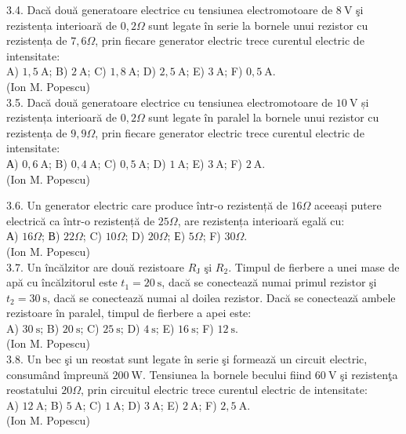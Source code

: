 \documentclass[10pt]{article}
\begin{document}
3.4. Dacă două generatoare electrice cu tensiunea electromotoare de $8 \mathrm{~V}$ şi rezistența interioară de $0,2 \Omega$ sunt legate în serie la bornele unui rezistor cu rezistența de $7,6 \Omega$, prin fiecare generator electric trece curentul electric de intensitate:\\ A) $1,5 \mathrm{~A}$; B) $2 \mathrm{~A}$; C) $1,8 \mathrm{~A}$; D) $2,5 \mathrm{~A}$; E) $3 \mathrm{~A}$; F) $0,5 \mathrm{~A}$.\\ (Ion M. Popescu)\\

3.5. Dacă două generatoare electrice cu tensiunea electromotoare de $10 \mathrm{~V}$ și rezistența interioară de $0,2 \Omega$ sunt legate în paralel la bornele unui rezistor cu rezistența de $9,9 \Omega$, prin fiecare generator electric trece curentul electric de intensitate:\\ А) $0,6 \mathrm{~A}$; B) $0,4 \mathrm{~A}$; C) $0,5 \mathrm{~A}$; D) $1 \mathrm{~A}$; E) $3 \mathrm{~A}$; F) $2 \mathrm{~A}$.\\ (Ion M. Popescu)

3.6. Un generator electric care produce într-o rezistență de $16 \Omega$ aceeași putere electrică ca într-o rezistență de $25 \Omega$, are rezistența interioară egală cu:\\ А) $16 \Omega$; В) $22 \Omega$; C) $10 \Omega$; D) $20 \Omega$; Е) $5 \Omega$; F) $30 \Omega$.\\ (Ion M. Popescu)\\

3.7. Un încălzitor are două rezistoare $R_{\mathrm{J}}$ şi $R_{2}$. Timpul de fierbere a unei mase de apă cu încălzitorul este $t_{1}=20 \mathrm{~s}$, dacă se conectează numai primul rezistor şi $t_{2}=30 \mathrm{~s}$, dacă se conectează numai al doilea rezistor. Dacă se conectează ambele rezistoare în paralel, timpul de fierbere a apei este:\\ A) $30 \mathrm{~s}$; B) $20 \mathrm{~s}$; C) $25 \mathrm{~s}$; D) $4 \mathrm{~s}$; E) $16 \mathrm{~s}$; F) $12 \mathrm{~s}$.\\ (Ion M. Popescu)\\

3.8. Un bec şi un reostat sunt legate în serie şi formează un circuit electric, consumând împreună $200 \mathrm{~W}$. Tensiunea la bornele becului fiind $60 \mathrm{~V}$ şi rezistenţa reostatului $20 \Omega$, prin circuitul electric trece curentul electric de intensitate:\\ A) $12 \mathrm{~A}$; B) $5 \mathrm{~A}$; C) $1 \mathrm{~A}$; D) $3 \mathrm{~A}$; E) $2 \mathrm{~A}$; F) $2,5 \mathrm{~A}$.\\ (Ion M. Popescu)\\
\end{document}
